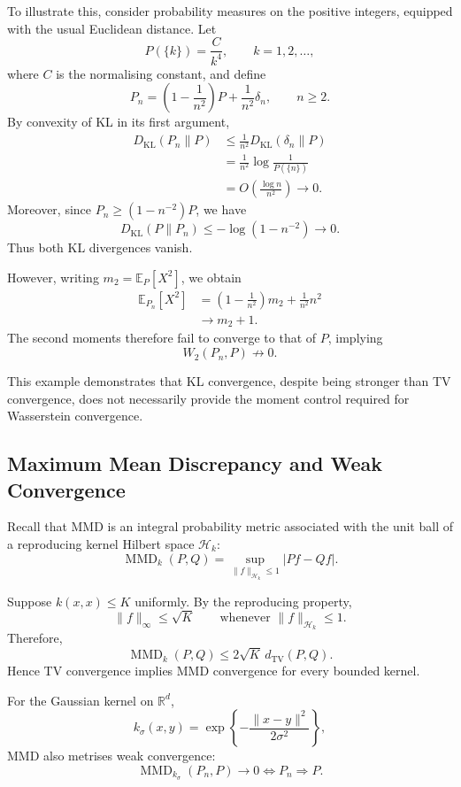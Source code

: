 \documentclass[
  11pt,
  a4paper,
  notitlepage
]{report}
\begin{document}
To illustrate this, consider probability measures
on the positive integers, equipped with the usual
Euclidean distance. Let
\[
P(\{k\})=\frac{C}{k^4},
\qquad k=1,2,\ldots,
\]
where $C$ is the normalising constant, and define
\[
P_n=
\left(1-\frac1{n^2}\right)P
+\frac1{n^2}\delta_n,
\qquad n\geq2.
\]
By convexity of KL in its first argument,
\[
\begin{aligned}
D_{\mathrm{KL}}(P_n\|P)
&\leq
\frac1{n^2}
D_{\mathrm{KL}}(\delta_n\|P)\\
&=
\frac1{n^2}\log\frac1{P(\{n\})}\\
&=
O\left(\frac{\log n}{n^2}\right)
\longrightarrow0.
\end{aligned}
\]
Moreover, since
$P_n\geq(1-n^{-2})P$, we have
\[
D_{\mathrm{KL}}(P\|P_n)
\leq-\log(1-n^{-2})\longrightarrow0.
\]
Thus both KL divergences vanish.

However, writing $m_2=\mathbb E_P[X^2]$, we obtain
\[
\begin{aligned}
\mathbb E_{P_n}[X^2]
&=
\left(1-\frac1{n^2}\right)m_2
+\frac1{n^2}n^2\\
&\longrightarrow m_2+1.
\end{aligned}
\]
The second moments therefore fail to converge to
that of $P$, implying
\[
W_2(P_n,P)\not\longrightarrow0.
\]

This example demonstrates that KL convergence,
despite being stronger than TV convergence, does
not necessarily provide the moment control required
for Wasserstein convergence.

\subsection{Maximum Mean Discrepancy and Weak Convergence}

Recall that MMD is an integral probability metric
associated with the unit ball of a reproducing kernel
Hilbert space $\mathcal H_k$:
\[
\operatorname{MMD}_k(P,Q)
=
\sup_{\|f\|_{\mathcal H_k}\leq1}
|Pf-Qf|.
\]

Suppose $k(x,x)\leq K$ uniformly. By the reproducing
property,
\[
\|f\|_\infty\leq\sqrt K
\qquad
\text{whenever }\|f\|_{\mathcal H_k}\leq1.
\]
Therefore,
\[
\boxed{
\operatorname{MMD}_k(P,Q)
\leq2\sqrt K\,d_{\mathrm{TV}}(P,Q).
}
\]
Hence TV convergence implies MMD convergence
for every bounded kernel.

For the Gaussian kernel on $\mathbb R^d$,
\[
k_\sigma(x,y)
=
\exp\left\{
-\frac{\|x-y\|^2}{2\sigma^2}
\right\},
\]
MMD also metrises weak convergence:
\[
\boxed{
\operatorname{MMD}_{k_\sigma}(P_n,P)\to0
\iff P_n\Rightarrow P.
}
\]
\end{document}
